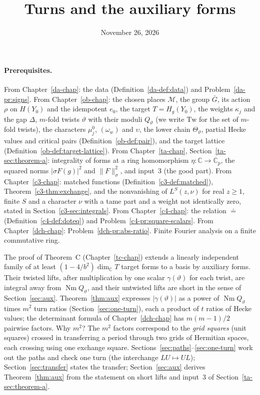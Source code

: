 \documentclass[reqno]{amsart}
\title{Turns and the auxiliary forms}
\author{}
\date{November 26, 2026}
\newcounter{chap}
\theoremstyle{definition}
\theoremstyle{plain}
\newcommand{\C}{\mathbb C}
\newcommand{\Nm}{\operatorname{Nm}}
\newcommand{\Tw}{\mathrm{Tw}}
\newcommand{\cM}{\mathcal M}
\newcommand{\Gb}{\bar G}
\begin{document}
\maketitle
{}\label{chap}

\paragraph{Prerequisites.}
From Chapter~\ref{da-chap}: the data (Definition~\ref{da-def:data}) and Problem~\ref{da-pr:signs}.  From Chapter~\ref{ob-chap}: the chosen places \(\cM\), the group \(\Gb\), its action \(\rho\) on \(H(Y_0)\) and the idempotent \(e_0\), the target \(T = H_g(Y_0)\), the weights \(\kappa_j\) and the gap \(\Delta\), \(m\)-fold twists \(\vartheta\) with their moduli \(Q_\vartheta\) (we write \(\Tw\) for the set of \(m\)-fold twists), the characters \(\mu_j^0\), \((\omega_w)\) and \(\upsilon\), the lower chain \(\Theta_\vartheta\), partial Hecke values and critical pairs (Definition~\ref{ob-def:pair}), and the target lattice (Definition~\ref{ob-def:target-lattice}).  From Chapter~\ref{ta-chap}, Section~\ref{ta-sec:theorem-a}: integrality of forms at a ring homomorphism \(\eta\colon\C\to\C_p\), the squared norms \(\lvert\sigma F(g)\rvert^2\) and \(\lVert F\rVert_\sigma^2\), and input~3 (the good part).  From Chapter~\ref{c3-chap}: matched functions (Definition~\ref{c3-def:matched}), Theorem~\ref{c3-thm:exchange}, and the nonvanishing of \(L^S(z,\nu)\) for real \(z \ge 1\), finite \(S\) and a character \(\nu\) with a tame part and a weight not identically zero, stated in Section~\ref{c3-sec:integrals}.  From Chapter~\ref{c4-chap}: the relation \(\doteq\) (Definition~\ref{c4-def:doteq}) and Problem~\ref{c4-pr:square-scalars}.  From Chapter~\ref{dch-chap}: Problem~\ref{dch-pr:abs-ratio}.  Finite Fourier analysis on a finite commutative ring.

\medskip
The proof of Theorem~C (Chapter~\ref{tc-chap}) extends a linearly independent family of at least \((1 - 4/b^2)\dim_{\C} T\) target forms to a basis by auxiliary forms.  Their twisted lifts, after multiplication by one scalar \(\gamma(\vartheta)\) for each twist, are integral away from \(\Nm Q_\vartheta\), and their untwisted lifts are short in the sense of Section~\ref{sec:aux}.  Theorem~\ref{thm:aux} expresses \(\lvert\gamma(\vartheta)\rvert\) as a power of \(\Nm Q_\vartheta\) times \(m^2\) turn ratios (Section~\ref{sec:one-turn}), each a product of \(t\) ratios of Hecke values; the determinant formula of Chapter~\ref{dch-chap} has \(m(m-1)/2\) pairwise factors.  Why \(m^2\)?  The \(m^2\) factors correspond to the \emph{grid squares} (unit squares) crossed in transferring a period through two grids of Hermitian spaces, each crossing using one exchange square.  Sections~\ref{sec:paths}--\ref{sec:one-turn} work out the paths and check one turn (the interchange \(LU\mapsto UL\)); Section~\ref{sec:transfer} states the transfer; Section~\ref{sec:aux} derives Theorem~\ref{thm:aux} from the statement on short lifts and input~3 of Section~\ref{ta-sec:theorem-a}.
\end{document}
